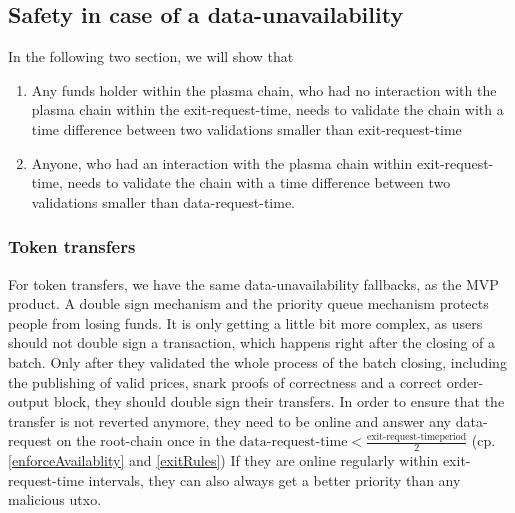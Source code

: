 \documentclass[11pt,parskip=full]{scrartcl}%
\begin{document}
\subsection{Safety in case of a data-unavailability}
In the following two section, we will show that 
\begin{enumerate}
\item Any funds holder within the plasma chain, who had no interaction with the plasma chain within the exit-request-time, needs to validate the chain with a time difference between two validations smaller than exit-request-time
\item Anyone, who had an interaction with the plasma chain within exit-request-time, needs to validate the chain with a time difference between two validations smaller than data-request-time.
\end{enumerate}
\subsubsection{Token transfers}
For token transfers, we have the same data-unavailability fallbacks, as the MVP product. 
A double sign mechanism and the priority queue mechanism protects people from losing funds. 
It is only getting a little bit more complex, as users should not double sign a transaction, which happens right after the closing of a batch.
Only after they validated the whole process of the batch closing, including the publishing of valid prices, snark proofs of correctness and a correct order-output block, they should double sign their transfers.
In order to ensure that the transfer is not reverted anymore, they need to be online and answer any data-request on the root-chain once in the $\text{data-request-time}< \frac{\text{exit-request-timeperiod}}{2}$ (cp. \ref{enforceAvailablity} and \ref{exitRules}) \newline
If they are online regularly within exit-request-time intervals, they can also always get a better priority than any malicious utxo.
\end{document}
